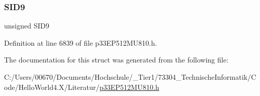 \subsubsection{\texorpdfstring{S\+I\+D9}{SID9}}
{\footnotesize\ttfamily unsigned S\+I\+D9}



Definition at line 6839 of file p33\+E\+P512\+M\+U810.\+h.



The documentation for this struct was generated from the following file\+:\begin{DoxyCompactItemize}
\item 
C\+:/\+Users/00670/\+Documents/\+Hochschule/\+\_\+\+Tier1/73304\+\_\+\+Technische\+Informatik/\+Code/\+Hello\+World4.\+X/\+Literatur/\hyperlink{p33_e_p512_m_u810_8h}{p33\+E\+P512\+M\+U810.\+h}\end{DoxyCompactItemize}
